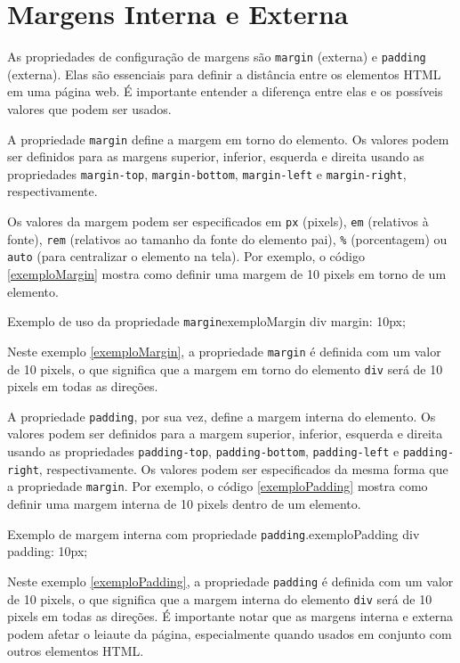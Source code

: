 \section{Margens Interna e Externa}

As propriedades de configuração de margens são \texttt{margin} (externa) e \texttt{padding} (externa). Elas são essenciais para definir a distância entre os elementos HTML em uma página web. É importante entender a diferença entre elas e os possíveis valores que podem ser usados.

A propriedade \texttt{margin} define a margem em torno do elemento. Os valores podem ser definidos para as margens superior, inferior, esquerda e direita usando as propriedades \texttt{margin-top}, \texttt{margin-bottom}, \texttt{margin-left} e \texttt{margin-right}, respectivamente. 

Os valores da margem podem ser especificados em \texttt{px} (pixels), \texttt{em} (relativos à fonte), \texttt{rem} (relativos ao tamanho da fonte do elemento pai), \texttt{\%} (porcentagem) ou \texttt{auto} (para centralizar o elemento na tela). Por exemplo, o código \ref{exemploMargin} mostra como definir uma margem de 10 pixels em torno de um elemento.

\begin{csscode}{Exemplo de uso da propriedade \texttt{margin}}{exemploMargin}
div {
    margin: 10px;
}
\end{csscode}

Neste exemplo \ref{exemploMargin}, a propriedade \texttt{margin} é definida com um valor de 10 pixels, o que significa que a margem em torno do elemento \texttt{div} será de 10 pixels em todas as direções.

A propriedade \texttt{padding}, por sua vez, define a margem interna do elemento. Os valores podem ser definidos para a margem superior, inferior, esquerda e direita usando as propriedades \texttt{padding-top}, \texttt{padding-bottom}, \texttt{padding-left} e \texttt{padding-right}, respectivamente. Os valores podem ser especificados da mesma forma que a propriedade \texttt{margin}. Por exemplo, o código \ref{exemploPadding} mostra como definir uma margem interna de 10 pixels dentro de um elemento.

\begin{csscode}{Exemplo de margem interna com propriedade \texttt{padding}.}{exemploPadding}
div {
    padding: 10px;
}
\end{csscode}

Neste exemplo \ref{exemploPadding}, a propriedade \texttt{padding} é definida com um valor de 10 pixels, o que significa que a margem interna do elemento \texttt{div} será de 10 pixels em todas as direções. É importante notar que as margens interna e externa podem afetar o leiaute da página, especialmente quando usados em conjunto com outros elementos HTML. 

